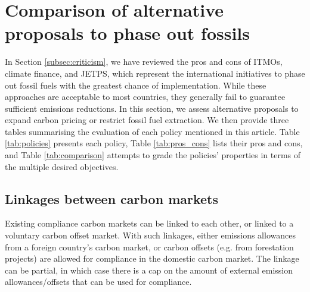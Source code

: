 \documentclass[12pt,english]{article}
\begin{document}
\section{Comparison of alternative proposals to phase out fossils} %

In Section \ref{subsec:criticism}, we have reviewed the pros and cons of ITMOs, climate finance, and JETPS, which represent the international initiatives to phase out fossil fuels with the greatest chance of implementation. While these approaches are acceptable to most countries, they generally fail to guarantee sufficient emissions reductions. In this section, we assess alternative proposals to expand carbon pricing or restrict fossil fuel extraction. We then provide three tables summarising the evaluation of each policy mentioned in this article.  Table \ref{tab:policies} presents each policy, Table \ref{tab:pros_cons} lists their pros and cons, and Table \ref{tab:comparison} attempts to grade the policies' properties in terms of the multiple desired objectives. 

\subsection{Linkages between carbon markets}

Existing compliance carbon markets can be linked to each other, or linked to a voluntary carbon offset market.\citep{jaffe_linking_2010} With such linkages, either emissions allowances from a foreign country's carbon market, or carbon offsets (e.g. from forestation projects) are allowed for compliance in the domestic carbon market. The linkage can be partial, in which case there is a cap on the amount of external emission allowances/offsets that can be used for compliance. 
\end{document}
